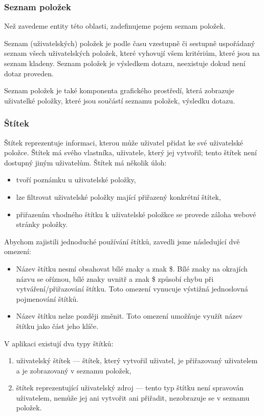 \subsubsection{Seznam položek}
Než zavedeme entity této oblasti, zadefinujeme pojem seznam položek.

Seznam (uživatelských) položek je podle času vzestupně či sestupně uspořádaný seznam všech uživatelských položek, které vyhovují všem kritériům, které jsou na seznam kladeny.
Seznam položek je výsledkem dotazu, neexistuje dokud není dotaz proveden.

Seznam položek je také komponenta grafického prostředí, která zobrazuje uživatelké položky, které jsou součástí seznamu položek, výsledku dotazu.

\subsubsection{Štítek}\label{entity-label}

Štítek reprezentuje informaci, kterou může uživatel přidat ke své uživatelské položce.
Štítek má svého vlastníka, uživatele, který jej vytvořil; tento štítek není dostupný jiným uživatelům.
Štítek má několik úloh:
\begin{itemize}
	\item tvoří poznámku u uživatelské položky,
	\item lze filtrovat uživatelské položky mající přiřazený konkrétní štítek,
	\item přiřazením vhodného štítku k uživatelské položkce se provede záloha webové stránky položky.
\end{itemize}

Abychom zajistili jednoduché používání štítků, zavedli jsme následující dvě omezení:
\begin{itemize}
	\item Název štítku nesmí obsahovat bílé znaky a znak \$.
		Bílé znaky na okrajích názvu se oříznou, bílé znaky uvnitř a znak \$ způsobí chybu při vytváření/přiřazování štítku.
		Toto omezení vynucuje výstižná jednoslovná pojmenování štítků.
	\item Název štítku nelze později změnit.
		Toto omezení umožňuje využít název štítku jako část jeho klíče.
\end{itemize}

V aplikaci existují dva typy štítků:
\begin{enumerate}
	\item uživatelský štítek --- štítek, který vytvořil uživatel, je přiřazovaný uživatelem a je zobrazovaný v seznamu položek,
	\item štítek reprezentující uživatelský zdroj --- tento typ štítku není spravován uživatelem, nemůže jej ani vytvořit ani přiřadit, nezobrazuje se v seznamu položek.
\end{enumerate}

